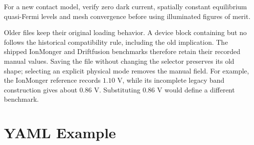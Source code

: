 \documentclass[
  11pt,
  american,
]{report}
\begin{document}
For a new contact model, verify zero dark current, spatially constant
equilibrium quasi-Fermi levels and mesh convergence before using
illuminated figures of merit.

Older files keep their original loading behavior. A device block
containing  but no  follows the
historical compatibility rule, including the old
 implication. The shipped IonMonger and
Driftfusion benchmarks therefore retain their recorded manual values.
Saving the file without changing the selector preserves its old shape;
selecting an explicit physical mode removes the manual field. For
example, the IonMonger reference records \(1.10\) V, while its
incomplete legacy band construction gives about \(0.86\) V. Substituting
\(0.86\) V would define a different benchmark.

\hypertarget{yaml-example}{%
\section{YAML Example}\label{yaml-example}}
\end{document}
